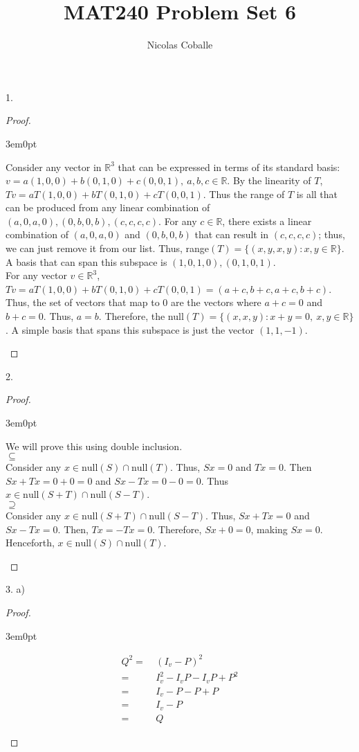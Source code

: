 \documentclass[11pt]{article}
\title{MAT240 Problem Set 6}
\author{Nicolas Coballe}
\newcommand{\R}{\mathbb{R}}
\newenvironment{myproof}
{\begin{proof} \begin{adjustwidth}{3em}{0pt}$ $\par\nobreak\ignorespaces}
{\end{adjustwidth} \end{proof}}
\begin{document}
\maketitle
\begin{flushleft}

1.
\begin{myproof}

Consider any vector in $\R^3$ that can be expressed in terms of its standard basis: $v = a(1,0,0) + b(0,1,0) + c(0,0,1), \ a,b,c \in \R$. By the linearity of $T$, $Tv = aT(1,0,0) + bT(0,1,0) + cT(0,0,1)$. Thus the range of $T$ is all that can be produced from any linear combination of $(a,0,a,0), (0,b,0,b), (c,c,c,c)$. For any $c \in \R$, there exists a linear combination of $(a,0,a,0)$ and  $(0,b,0,b)$ that can result in $(c,c,c,c)$; thus, we can just remove it from our list. Thus, range$(T) = \{(x,y,x,y): x,y \in \R \}$. A basis that can span this subspace is $(1,0,1,0), (0,1,0,1)$. \\
\bigskip
For any vector $v \in \R^3$, $Tv = aT(1,0,0) + bT(0,1,0) + cT(0,0,1) = (a+c,b+c,a+c,b+c)$. Thus, the set of vectors that map to 0 are the vectors where $a + c = 0$ and $b + c = 0$. Thus, $a = b$. Therefore, the null$(T) = \{ (x,x,y): x+y=0, \ x,y \in \R \}$. A simple basis that spans this subspace is just the vector $(1,1,-1)$.

\end{myproof}

\newpage

2.

\begin{myproof}
We will prove this using double inclusion. \\
\bigskip
$\subseteq$ \\
Consider any $x \in \text{null}(S) \cap \text{null}(T)$. Thus, $Sx = 0$ and $Tx = 0$. Then $Sx + Tx = 0 + 0 = 0$ and $Sx - Tx = 0 - 0 = 0$. Thus $x \in \text{null}(S+T) \cap \text{null}(S-T)$. \\
\bigskip
$\supseteq$ \\
Consider any $x \in \text{null}(S+T) \cap \text{null}(S-T)$. Thus, $Sx + Tx = 0$ and $Sx - Tx = 0$. Then, $Tx = -Tx = 0$. Therefore, $Sx + 0 = 0$, making $Sx = 0$. Henceforth, $x \in \text{null}(S) \cap \text{null}(T)$.
\end{myproof}

\newpage

3. a)

\begin{myproof}

\begin{align*}
Q^2 =& \ (I_v - P)^2 \\
= & \ I_v^2 -I_vP -I_vP + P^2 \\
= & \ I_v - P -P + P \\
= & \ I_v - P \\
= & \ Q
\end{align*}


\end{myproof}
\end{flushleft}
\end{document}
